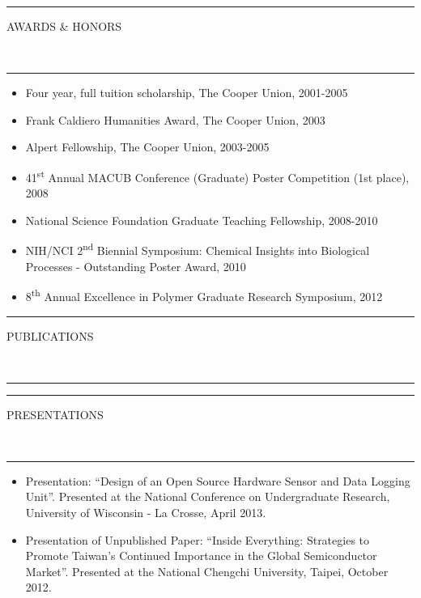 \documentclass[10pt, letterpaper, oneside]{article}
\newcommand{\HRule}[2]{\textcolor{#1}{\rule{\linewidth}{#2}}}
\newcommand{\sectiontitle}[1]{\begin{minipage}{\textwidth}\HRule{black}{0.25mm}\vspace{-10pt}\begin{center}\Large\MakeUppercase{#1}\end{center}\end{minipage}\\\HRule{light-grey}{0.15mm}\vspace{\baselineskip}}
\newenvironment{tightressection}[1]{
  \begin{minipage}{\textwidth}
  \sectiontitle{#1}}
  {\vspace{\baselineskip}\end{minipage}}
\newenvironment{rescolumn}{
  \begin{minipage}{0.5\textwidth}
    \begin{itemize}[noitemsep,nolistsep]}
  {\end{itemize}
    \end{minipage}}
\newcommand{\resitem}[1]{
	\vspace{2pt}
	\item \begin{flushleft} #1 \end{flushleft}
}
\begin{document}
\vspace{\baselineskip}
\begin{tightressection}{awards \& honors}
  \begin{rescolumn}
      \resitem{Four year, full tuition scholarship, The Cooper Union, 2001-2005}
      \resitem{Frank Caldiero Humanities Award, The Cooper Union, 2003}
      \resitem{Alpert Fellowship, The Cooper Union, 2003-2005}
      \resitem{41\textsuperscript{st} Annual MACUB Conference (Graduate) Poster Competition (1st place), 2008}
    \end{rescolumn}
  \begin{rescolumn}
      \resitem{National Science Foundation Graduate Teaching Fellowship, 2008-2010}
      \resitem{NIH/NCI 2\textsuperscript{nd} Biennial Symposium: Chemical Insights into Biological Processes - Outstanding Poster Award, 2010}
      \resitem{8\textsuperscript{th} Annual Excellence in Polymer Graduate Research Symposium, 2012}
    \end{rescolumn}
\end{tightressection}

\begin{tightressection}{publications}
    \vspace{-2\baselineskip}
    \nocite{*}
    \printbibliography[heading=none]
\end{tightressection}

\begin{tightressection}{presentations}
    \vspace{-2\baselineskip}
  \begin{itemize}[noitemsep,nolistsep]
    \resitem{Presentation: ``Design of an Open Source Hardware Sensor and Data Logging Unit''.  Presented at the National Conference on Undergraduate Research, University of Wisconsin - La Crosse, April 2013.}
    \resitem{Presentation of Unpublished Paper: ``Inside Everything: Strategies to Promote Taiwan's Continued Importance in the Global Semiconductor Market''. Presented at the National Chengchi University, Taipei, October 2012.}
  \end{itemize}
\end{tightressection}
\end{document}
